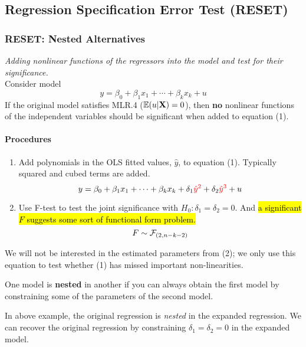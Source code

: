 \documentclass[]{article}
\begin{document}
		\subsection{Regression Specification Error Test (RESET)}
		\subsubsection{RESET: Nested Alternatives}
			\par \emph{Adding nonlinear functions of the regressors into the model and test for their significance.}
			\\
			Consider model 
			\begin{equation}
				y = \beta_0 + \beta_1 x_1 + \cdots + \beta_k x_k + u
			\end{equation}
			If the original model satisfies MLR.4 ($\mathbb{E}({u|\textbf{X}})=0$), then \textbf{no} nonlinear functions of the independent variables should be significant when added to equation (1). 
			
			\paragraph{Procedures}
			\begin{enumerate}
				\item Add polynomials in the OLS fitted values, $\hat{y}$, to equation (1). Typically squared and cubed terms are added.
					\begin{equation}
						y = \beta_0 + \beta_1 x_1 + \cdots + \beta_k x_k + \delta_1 \textcolor{red}{\hat{y}^2} + \delta_2 \textcolor{red}{\hat{y}^3} + u
					\end{equation}
				\item Use F-test to test the joint significance with $H_0: \delta_1 = \delta_2 = 0$. And \hl{a significant $F$ suggests some sort of functional form problem.}
					\[
						F \sim \mathcal{{F}}_{(2, n-k-2)}
					\]
			\end{enumerate}
			\begin{remark}
				We will not be interested in the estimated parameters from (2); we only use this equation to test whether (1) has missed important non-linearities.
			\end{remark}
			
			
			\begin{remark}
				One model is \textbf{nested} in another if you can always obtain the first model by constraining some of the parameters of the second model.
			\end{remark}
			\begin{example}
				In above example, the original regression is \emph{nested} in the expanded regression. We can recover the original regression by constraining $\delta_1 = \delta_2 = 0$ in the expanded model.
			\end{example}
			
\end{document}
